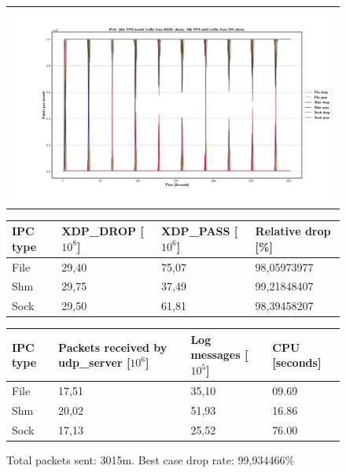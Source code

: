 \begin{figure}[!h]
	\centering
	\scriptsize
	\begin{tabular}{c}
    	\centerline{\includegraphics[width=1.2\textwidth]{images/IPv4_10m_65534_1.png}}
	\end{tabular}
	\begin{tabular}{llll}
		\toprule
		\textbf{IPC type} & \textbf{XDP\_DROP [$10^8$]} & \textbf{XDP\_PASS [$10^6$]} & \textbf{Relative drop [\%]} \\ \midrule 
		File & 29,40 & 75,07 & 98,05973977 \\
        Shm & 29,75 & 37,49 & 99,21848407 \\
        Sock & 29,50 & 61,81 & 98,39458207 \\
	\bottomrule
	\end{tabular}
    \begin{tabular}{llll}
		\toprule
		\textbf{IPC type} & \textbf{Packets received by udp\_server [$10^6$]} & \textbf{Log messages [$10^5$]} & \textbf{CPU [seconds]} \\ \midrule 
		File & 17,51 & 35,10 & 09.69 \\
        Shm & 20,02 & 51,93 & 16.86 \\
        Sock & 17,13 & 25,52 & 76.00 \\
	\bottomrule
	\end{tabular}
	\caption[Simplefail2ban, IPv4, 10m \ac{PPS}, 65534 malicious clients]{Total packets sent: 3015m. Best case drop rate: 99,934466\%}
	\label{fig:data:ipv4:10m:65534}
\end{figure}

